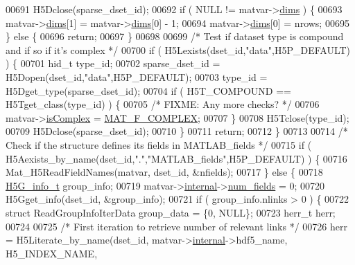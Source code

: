 \begin{DoxyCode}
00691         H5Dclose(sparse\_dset\_id);
00692         \textcolor{keywordflow}{if} ( NULL != matvar->\hyperlink{group___m_a_t_a8e01234e1c862ce3472bb37f5a09b92c}{dims} ) \{
00693             matvar->\hyperlink{group___m_a_t_a8e01234e1c862ce3472bb37f5a09b92c}{dims}[1] = matvar->\hyperlink{group___m_a_t_a8e01234e1c862ce3472bb37f5a09b92c}{dims}[0] - 1;
00694             matvar->\hyperlink{group___m_a_t_a8e01234e1c862ce3472bb37f5a09b92c}{dims}[0] = nrows;
00695         \} \textcolor{keywordflow}{else} \{
00696             \textcolor{keywordflow}{return};
00697         \}
00698 
00699         \textcolor{comment}{/* Test if dataset type is compound and if so if it's complex */}
00700         \textcolor{keywordflow}{if} ( H5Lexists(dset\_id,\textcolor{stringliteral}{"data"},H5P\_DEFAULT) ) \{
00701             hid\_t type\_id;
00702             sparse\_dset\_id = H5Dopen(dset\_id,\textcolor{stringliteral}{"data"},H5P\_DEFAULT);
00703             type\_id = H5Dget\_type(sparse\_dset\_id);
00704             \textcolor{keywordflow}{if} ( H5T\_COMPOUND == H5Tget\_class(type\_id) ) \{
00705                 \textcolor{comment}{/* FIXME: Any more checks? */}
00706                 matvar->\hyperlink{group___m_a_t_aeb03b3a69f108dc05470b00443a43739}{isComplex} = \hyperlink{group___m_a_t_ggab9d6ef9e3ddca78a317b173f01d53fbbacd7b091a11184aad7fc6078c04470780}{MAT\_F\_COMPLEX};
00707             \}
00708             H5Tclose(type\_id);
00709             H5Dclose(sparse\_dset\_id);
00710         \}
00711         \textcolor{keywordflow}{return};
00712     \}
00713 
00714     \textcolor{comment}{/* Check if the structure defines its fields in MATLAB\_fields */}
00715     \textcolor{keywordflow}{if} ( H5Aexists\_by\_name(dset\_id,\textcolor{stringliteral}{"."},\textcolor{stringliteral}{"MATLAB\_fields"},H5P\_DEFAULT) ) \{
00716         Mat\_H5ReadFieldNames(matvar, dset\_id, &nfields);
00717     \} \textcolor{keywordflow}{else} \{
00718         \hyperlink{struct_h5_g__info__t}{H5G\_info\_t} group\_info;
00719         matvar->\hyperlink{group___m_a_t_a6e97e3ed9f40c49322c18561c2a94e92}{internal}->\hyperlink{structmatvar__internal_a93fc447484f455eddf9334f2e9e411c2}{num\_fields} = 0;
00720         H5Gget\_info(dset\_id, &group\_info);
00721         \textcolor{keywordflow}{if} ( group\_info.nlinks > 0 ) \{
00722             \textcolor{keyword}{struct }ReadGroupInfoIterData group\_data = \{0, NULL\};
00723             herr\_t herr;
00724 
00725             \textcolor{comment}{/* First iteration to retrieve number of relevant links */}
00726             herr = H5Literate\_by\_name(dset\_id, matvar->\hyperlink{group___m_a_t_a6e97e3ed9f40c49322c18561c2a94e92}{internal}->hdf5\_name, H5\_INDEX\_NAME,

\end{DoxyCode}
